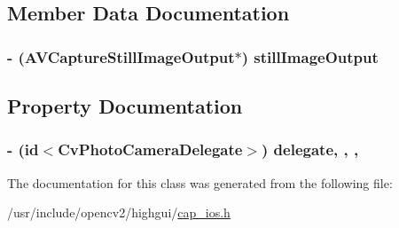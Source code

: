 \subsection{Member Data Documentation}
\hypertarget{interfaceCvPhotoCamera_ad27c86e27dfe3fc626fe9a1bda9e0c73}{
\subsubsection[{still\-Image\-Output}]{\setlength{\rightskip}{0pt plus 5cm}-\/ (A\-V\-Capture\-Still\-Image\-Output$\ast$) still\-Image\-Output\hspace{0.3cm}{\ttfamily [protected]}}}\label{interfaceCvPhotoCamera_ad27c86e27dfe3fc626fe9a1bda9e0c73}


\subsection{Property Documentation}
\hypertarget{interfaceCvPhotoCamera_a7198da91a6278007ffa227ed1ae0bdc4}{
\subsubsection[{delegate}]{\setlength{\rightskip}{0pt plus 5cm}-\/ (id$<${\bf Cv\-Photo\-Camera\-Delegate}$>$) delegate\hspace{0.3cm}{\ttfamily [read]}, {\ttfamily [write]}, {\ttfamily [nonatomic]}, {\ttfamily [assign]}}}\label{interfaceCvPhotoCamera_a7198da91a6278007ffa227ed1ae0bdc4}


The documentation for this class was generated from the following file\-:\begin{DoxyCompactItemize}
\item 
/usr/include/opencv2/highgui/\hyperlink{cap__ios_8h}{cap\-\_\-ios.\-h}\end{DoxyCompactItemize}
